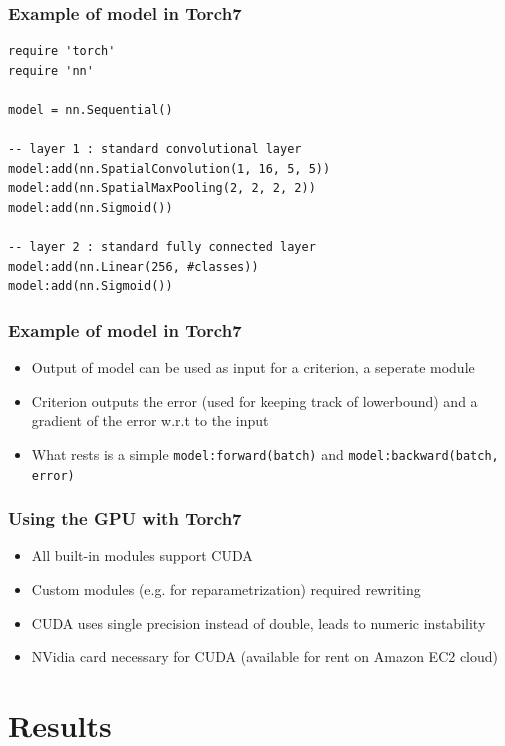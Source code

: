 \documentclass{beamer}
\begin{document}
\begin{frame}[fragile]
\frametitle{Example of model in Torch7}
\begin{lstlisting}
require 'torch'
require 'nn'

model = nn.Sequential()

-- layer 1 : standard convolutional layer
model:add(nn.SpatialConvolution(1, 16, 5, 5))
model:add(nn.SpatialMaxPooling(2, 2, 2, 2))
model:add(nn.Sigmoid())

-- layer 2 : standard fully connected layer
model:add(nn.Linear(256, #classes))
model:add(nn.Sigmoid())

\end{lstlisting}
\end{frame}


\begin{frame}
\frametitle{Example of model in Torch7}

\begin{itemize}
	\item Output of model can be used as input for a criterion, a seperate module
	\item Criterion outputs the error (used for keeping track of lowerbound) and a gradient of the error w.r.t to the input
	\item What rests is a simple \texttt{model:forward(batch)} and \texttt{model:backward(batch, error)}
\end{itemize}

\end{frame}

\begin{frame}
\frametitle{Using the GPU with Torch7}

\begin{itemize}
	\item All built-in modules support CUDA
	\item Custom modules (e.g. for reparametrization) required rewriting
	\item CUDA uses single precision instead of double, leads to numeric instability
	\item NVidia card necessary for CUDA (available for rent on Amazon EC2 cloud)
\end{itemize}

\end{frame}

 
\section{Results}
\end{document}
